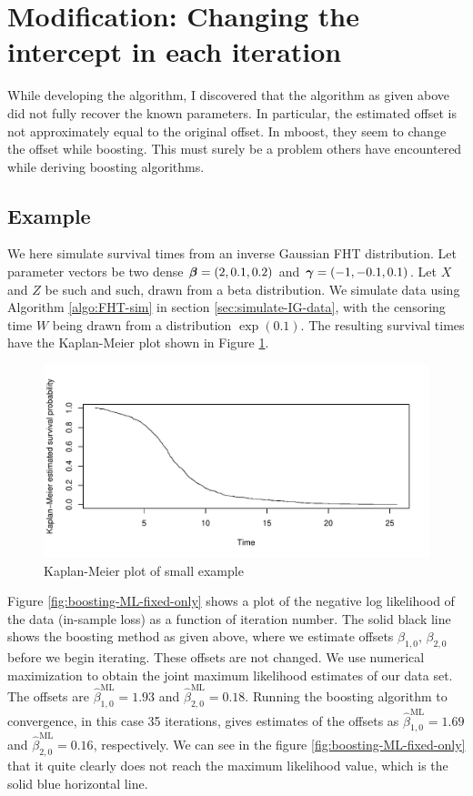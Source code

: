 \section{Modification: Changing the intercept in each iteration}
While developing the algorithm, I discovered that the algorithm as given above did not fully recover the known parameters.
In particular, the estimated offset is not approximately equal to the original offset.
In mboost, they seem to change the offset while boosting.
This must surely be a problem others have encountered while deriving boosting algorithms.

\subsection{Example}
We here simulate survival times from an inverse Gaussian FHT distribution.
Let parameter vectors be two dense $\boldsymbol{\beta}=(2,0.1,0.2)$ and $\boldsymbol{\gamma}=(-1, -0.1, 0.1)$.
Let $X$ and $Z$ be such and such, drawn from a beta distribution.
We simulate data using Algorithm \ref{algo:FHT-sim} in section \ref{sec:simulate-IG-data}, with the censoring time $W$ being drawn from a distribution $\exp(0.1)$.
The resulting survival times have the Kaplan-Meier plot shown in Figure \ref{fig:small-example-kaplan-meier}.
\begin{figure}\label{fig:small-example-kaplan-meier}
\caption{Kaplan-Meier plot of small example}
\centering\includegraphics[scale=0.4]{figures/case1.pdf}
\end{figure}
Figure \ref{fig:boosting-ML-fixed-only} shows a plot of the negative log likelihood of the data (in-sample loss) as a function of iteration number.
The solid black line shows the boosting method as given above, where we estimate offsets $\beta_{1,0},\,\beta_{2,0}$ before we begin iterating.
These offsets are not changed.
We use numerical maximization to obtain the joint maximum likelihood estimates of our data set.
The offsets are $\hat{\beta}^{\text{ML}}_{1,0}=1.93$ and $\hat{\beta}^{\text{ML}}_{2,0}=0.18$.
Running the boosting algorithm to convergence, in this case 35 iterations, gives estimates of the offsets as $\hat{\beta}^{\text{ML}}_{1,0}=1.69$ and $\hat{\beta}^{\text{ML}}_{2,0}=0.16$, respectively.
We can see in the figure \ref{fig:boosting-ML-fixed-only} that it quite clearly does not reach the maximum likelihood value, which is the solid blue horizontal line.


